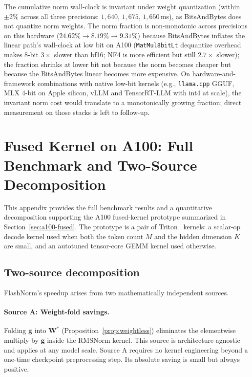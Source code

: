 \documentclass{article}
\begin{document}
The cumulative norm wall-clock is invariant under weight quantization (within $\pm 2\%$ across all three precisions: $1{,}640$, $1{,}675$, $1{,}650$\,ms), as BitsAndBytes does not quantize norm weights. The norm fraction is non-monotonic across precisions on this hardware ($24.62\% \to 8.19\% \to 9.31\%$) because BitsAndBytes inflates the linear path's wall-clock at low bit on A100 (\texttt{MatMul8bitLt} dequantize overhead makes 8-bit $3\times$ slower than bf16; NF4 is more efficient but still $2.7\times$ slower); the fraction shrinks at lower bit not because the norm becomes cheaper but because the BitsAndBytes linear becomes more expensive. On hardware-and-framework combinations with native low-bit kernels (e.g., \texttt{llama.cpp} GGUF, MLX 4-bit on Apple silicon, vLLM and TensorRT-LLM with int4 at scale), the invariant norm cost would translate to a monotonically growing fraction; direct measurement on those stacks is left to follow-up.

\section{Fused Kernel on A100: Full Benchmark and Two-Source Decomposition}\label{app:a100}

This appendix provides the full benchmark results and a quantitative decomposition supporting the A100 fused-kernel prototype summarized in Section~\ref{sec:a100-fused}. The prototype is a pair of Triton~\citep{triton} kernels: a scalar-op decode kernel used when both the token count $M$ and the hidden dimension $K$ are small, and an autotuned tensor-core GEMM kernel used otherwise.

\subsection{Two-source decomposition}

FlashNorm's speedup arises from two mathematically independent sources.

\paragraph{Source A: Weight-fold savings.} Folding $\mathbf{g}$ into $\mathbf{W}^\ast$ (Proposition~\ref{prop:weightless}) eliminates the elementwise multiply by $\mathbf{g}$ inside the RMSNorm kernel. This source is architecture-agnostic and applies at any model scale. Source A requires no kernel engineering beyond a one-time checkpoint preprocessing step. Its absolute saving is small but always positive.
\end{document}
